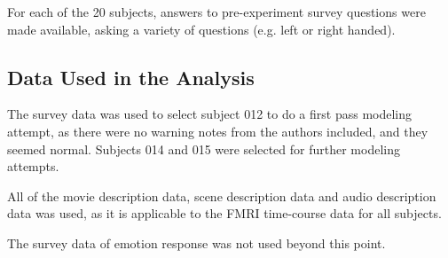 \par For each of the 20 subjects, answers to pre-experiment survey questions were made available, asking a variety of questions (e.g. left or right handed). 


\subsection{Data Used in the Analysis}
\par The survey data was used to select subject 012 to do a first pass modeling attempt, as there were no warning notes from the authors included, and they seemed normal. Subjects 014 and 015 were selected for further modeling attempts.

\par All of the movie description data, scene description data and audio description data was used, as it is applicable to the FMRI time-course data for all subjects. 

\par The survey data of emotion response was not used beyond this point.





